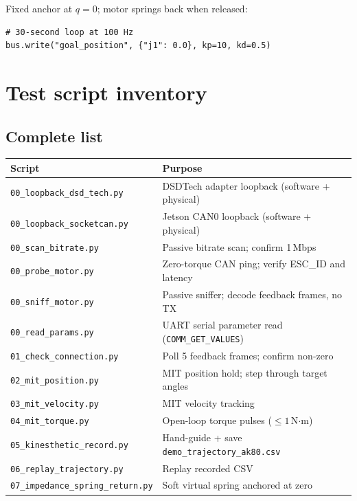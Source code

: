 \documentclass[11pt,a4paper]{article}
\begin{document}
Fixed anchor at $q = 0$; motor springs back when released:
\begin{lstlisting}
# 30-second loop at 100 Hz
bus.write("goal_position", {"j1": 0.0}, kp=10, kd=0.5)
\end{lstlisting}

\section{Test script inventory}
\label{sec:tests}

\subsection{Complete list}

\begin{center}\small
\begin{tabular}{lp{9cm}}
\toprule
Script & Purpose \\
\midrule
\texttt{00\_loopback\_dsd\_tech.py}       & DSDTech adapter loopback (software + physical) \\
\texttt{00\_loopback\_socketcan.py}       & Jetson CAN0 loopback (software + physical) \\
\texttt{00\_scan\_bitrate.py}             & Passive bitrate scan; confirm 1\,Mbps \\
\texttt{00\_probe\_motor.py}              & Zero-torque CAN ping; verify ESC\_ID and latency \\
\texttt{00\_sniff\_motor.py}              & Passive sniffer; decode feedback frames, no TX \\
\texttt{00\_read\_params.py}              & UART serial parameter read (\texttt{COMM\_GET\_VALUES}) \\
\texttt{01\_check\_connection.py}         & Poll 5 feedback frames; confirm non-zero \\
\texttt{02\_mit\_position.py}             & MIT position hold; step through target angles \\
\texttt{03\_mit\_velocity.py}             & MIT velocity tracking \\
\texttt{04\_mit\_torque.py}               & Open-loop torque pulses ($\le 1$\,N$\cdot$m) \\
\texttt{05\_kinesthetic\_record.py}       & Hand-guide + save \texttt{demo\_trajectory\_ak80.csv} \\
\texttt{06\_replay\_trajectory.py}        & Replay recorded CSV \\
\texttt{07\_impedance\_spring\_return.py} & Soft virtual spring anchored at zero \\
\bottomrule
\end{tabular}
\end{center}
\end{document}
